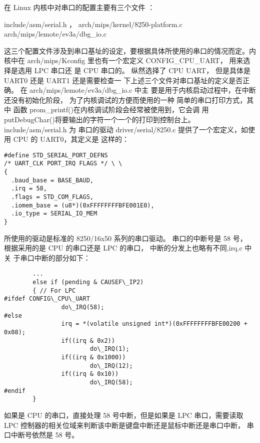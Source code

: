 在 Linux 内核中对串口的配置主要有三个文件 ：

        include/asm/serial.h ，
        arch/mips/kernel/8250-platform.c
        arch/mips/lemote/ev3a/dbg_io.c

这三个配置文件涉及到串口基址的设定，要根据具体所使用的串口的情况而定。内核中在
arch/mips/Kconfig 里也有一个宏定义 CONFIG\_CPU\_UART， 用来选择是选用 LPC 串口还
是 CPU 串口的。 纵然选择了 CPU UART， 但是具体是 UART0 还是 UART1 还是需要检查一
下上述三个文件对串口基址的定义是否正确。 在 arch/mips/lemote/ev3a/dbg\_io.c 中主
要是用于内核启动过程中，在中断还没有初始化阶段， 为了内核调试的方便而使用的一种
简单的串口打印方式，其中 函数 prom\_printf()在内核调试阶段会经常被使用到，它会调
用 putDebugChar()将要输出的字符一个一个的打印到控制台上。include/asm/serial.h 为
串口的驱动 driver/serial/8250.c 提供了一个宏定义，如使用 CPU 的 UART0，其定义是
这样的：

\begin{lstlisting}
#define STD_SERIAL_PORT_DEFNS
/* UART_CLK PORT_IRQ FLAGS */ \ \
{
  .baud_base = BASE_BAUD,
  .irq = 58,
  .flags = STD_COM_FLAGS,
  .iomem_base = (u8*)(0xFFFFFFFFBFE001E0),
  .io_type = SERIAL_IO_MEM
}
\end{lstlisting}

所使用的驱动是标准的 8250/16x50 系列的串口驱动。 串口的中断号是 58 号，
根据采用的是 CPU 的串口还是 LPC 的串口， 中断的分发上也略有不同,irq.c 中关
于串口中断的部分如下：

\begin{lstlisting}
        ...
        else if (pending & CAUSEF\_IP2)
        { // For LPC
#ifdef CONFIG\_CPU\_UART
                do\_IRQ(58);
#else
                irq = *(volatile unsigned int*)(0xFFFFFFFFBFE00200 + 0x08);
                if((irq & 0x2))
                        do\_IRQ(1);
                if((irq & 0x1000))
                        do\_IRQ(12);
                if((irq & 0x10))
                        do\_IRQ(58);
#endif
        }
\end{lstlisting}

如果是 CPU 的串口，直接处理 58 号中断，但是如果是 LPC 串口，需要读取 LPC
控制器的相关位域来判断该中断是键盘中断还是鼠标中断还是串口中断，
串口中断号依然是 58 号。

